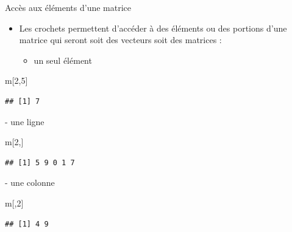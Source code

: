 \documentclass[
  ignorenonframetext,
]{beamer}
\newenvironment{Shaded}{\begin{snugshade}}{\end{snugshade}}
\newcommand{\DecValTok}[1]{\textcolor[rgb]{0.00,0.00,0.81}{#1}}
\newcommand{\NormalTok}[1]{#1}
\providecommand{\tightlist}{%
  \setlength{\itemsep}{0pt}\setlength{\parskip}{0pt}}
\begin{document}
\begin{frame}[fragile]{Accès aux éléments d'une matrice}
\protect\hypertarget{accuxe8s-aux-uxe9luxe9ments-dune-matrice}{}
\begin{itemize}
\tightlist
\item
  Les crochets permettent d'accéder à des éléments ou des portions d'une
  matrice qui seront soit des vecteurs soit des matrices :

  \begin{itemize}
  \tightlist
  \item
    un seul élément
  \end{itemize}
\end{itemize}

\tiny

\begin{Shaded}
\begin{Highlighting}[]
\NormalTok{m[}\DecValTok{2}\NormalTok{,}\DecValTok{5}\NormalTok{]}
\end{Highlighting}
\end{Shaded}

\begin{verbatim}
## [1] 7
\end{verbatim}

\normalsize - une ligne

\tiny

\begin{Shaded}
\begin{Highlighting}[]
\NormalTok{m[}\DecValTok{2}\NormalTok{,]}
\end{Highlighting}
\end{Shaded}

\begin{verbatim}
## [1] 5 9 0 1 7
\end{verbatim}

\normalsize - une colonne

\tiny

\begin{Shaded}
\begin{Highlighting}[]
\NormalTok{m[,}\DecValTok{2}\NormalTok{]}
\end{Highlighting}
\end{Shaded}

\begin{verbatim}
## [1] 4 9
\end{verbatim}

\normalsize
\end{frame}
\end{document}
